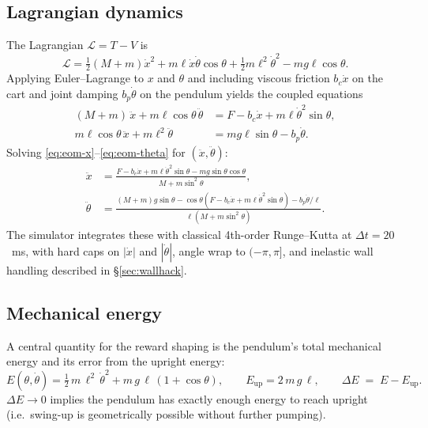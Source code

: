 \documentclass[11pt,a4paper]{article}
\begin{document}
\subsection{Lagrangian dynamics}
The Lagrangian $\mathcal{L} = T - V$ is
\begin{equation}
\mathcal{L} = \tfrac{1}{2}(M+m)\dot{x}^2 + m\ell\dot{x}\dot{\theta}\cos\theta
            + \tfrac{1}{2} m \ell^2 \dot{\theta}^2 - m g \ell \cos\theta.
\end{equation}
Applying Euler--Lagrange to $x$ and $\theta$ and including viscous friction
$b_c\dot{x}$ on the cart and joint damping $b_p\dot{\theta}$ on the pendulum
yields the coupled equations
\begin{align}
(M+m)\,\ddot{x} + m\ell\cos\theta\,\ddot{\theta}
   &= F - b_c\dot{x} + m\ell\dot{\theta}^2\sin\theta, \label{eq:eom-x}\\
m\ell\cos\theta\,\ddot{x} + m\ell^2\ddot{\theta}
   &= m g \ell \sin\theta - b_p \dot{\theta}. \label{eq:eom-theta}
\end{align}
Solving \eqref{eq:eom-x}--\eqref{eq:eom-theta} for $(\ddot{x},\ddot{\theta})$:
\begin{align}
\ddot{x} &= \frac{F - b_c\dot{x} + m\ell\dot{\theta}^2\sin\theta - m g \sin\theta\cos\theta}{M + m\sin^2\theta},\\
\ddot{\theta} &= \frac{(M+m)g\sin\theta - \cos\theta(F - b_c\dot{x} + m\ell\dot{\theta}^2\sin\theta) - b_p\dot{\theta}/\ell}{\ell(M + m\sin^2\theta)}.
\end{align}
The simulator integrates these with classical 4th-order Runge--Kutta at $\Delta t = 20$~ms, with hard caps on $|\dot{x}|$ and $|\dot{\theta}|$, angle wrap to $(-\pi,\pi]$, and inelastic wall handling described in \S\ref{sec:wallhack}.

\subsection{Mechanical energy}
A central quantity for the reward shaping is the pendulum's total mechanical energy and its error from the upright energy:
\begin{equation}
E(\theta,\dot{\theta}) = \tfrac{1}{2}\,m\,\ell^2\,\dot{\theta}^2 + m\,g\,\ell\,(1 + \cos\theta),
\qquad
E_{\text{up}} = 2\,m\,g\,\ell,
\qquad
\Delta E \;=\; E - E_{\text{up}}.
\label{eq:energy}
\end{equation}
$\Delta E \to 0$ implies the pendulum has exactly enough energy to reach upright (i.e.\ swing-up is geometrically possible without further pumping).
\end{document}
